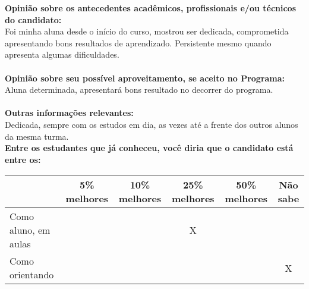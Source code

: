 \documentclass[11pt]{article}
\begin{document}
\textbf{Opinião sobre os antecedentes acadêmicos, profissionais e/ou técnicos do candidato:}
\\Foi minha aluna desde o início do curso, mostrou ser dedicada, comprometida apresentando bons resultados de aprendizado. Persistente mesmo quando apresenta algumas dificuldades.\\
\\
\textbf{Opinião sobre seu possível aproveitamento, se aceito no Programa:}
\\Aluna determinada, apresentará bons resultado no decorrer do programa.\\ 
\\
\textbf{Outras informações relevantes:} \\Dedicada, sempre com os estudos em dia, as vezes até a frente dos outros alunos da mesma turma.
\\[0.3cm]
\textbf{Entre os estudantes que já conheceu, você diria que o candidato está entre os:}
\\
\begin{tabular}{|l|c|c|c|c|c|}
\hline
 & 5\% melhores & 10\% melhores & 25\% melhores & 50\% melhores & Não sabe \\
\hline
Como aluno, em aulas &  &  & X &  & \\
\hline
Como orientando &  &  &  &  & X\\
\hline
\end{tabular}
\end{document}
